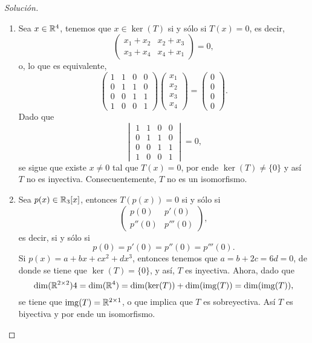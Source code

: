 \documentclass[a4,11pt]{aleph-notas}
\begin{document}
\begin{proof}[Solución]\hspace{0pt}
    \begin{enumerate}
        \item Sea $x\in\mathbb{R}^4$, tenemos que $x\in\ker(T)$ si y sólo si $T(x)=0$, es decir,
        \[
            \begin{pmatrix}
            x_1 + x_2 & x_2 + x_3\\
            x_3 + x_4 & x_4 + x_1
            \end{pmatrix} = 0,
        \]
        o, lo que es equivalente,
        \[
            \begin{pmatrix}
            1 & 1 & 0 & 0\\
            0 & 1 & 1 & 0\\
            0 & 0 & 1 & 1\\
            1 & 0 & 0 & 1 
            \end{pmatrix} \begin{pmatrix}
            x_1 \\ x_2 \\ x_3 \\ x_4
            \end{pmatrix} = \begin{pmatrix}
            0 \\ 0 \\ 0 \\ 0
            \end{pmatrix}.
        \]
        Dado que
        \[
            \begin{vmatrix}
            1 & 1 & 0 & 0\\
            0 & 1 & 1 & 0\\
            0 & 0 & 1 & 1\\
            1 & 0 & 0 & 1 
            \end{vmatrix} = 0,
        \]
        se sigue que existe $x\neq 0$ tal que $T(x) = 0$, por ende $\ker(T)\neq \{0\}$ y así $T$ no es inyectiva. Consecuentemente, $T$ no es un isomorfismo.
        
        \item Sea $p(x)\in\mathbb{R}_3[x]$, entonces $T(p(x))= 0$ si y sólo si
        \[
            \begin{pmatrix}
        p(0) & p'(0) \\
        p''(0) & p'''(0)
        \end{pmatrix},
        \]
        es decir, si y sólo si 
        \[
            p(0) = p'(0) = p''(0) = p'''(0).
        \]
        Si $p(x) = a + bx + cx^2 + dx^3$, entonces tenemos que $a = b + 2c = 6d = 0$, de donde se tiene que $\ker(T)=\{0\}$, y así, $T$ es inyectiva. Ahora, dado que
        \[
           \dim(\mathbb{R}^{2\times 2}) 4 = \dim(\mathbb{R}^4) = \dim(\ker(T)) + \dim(\operatorname{img}(T)) = \dim(\operatorname{img}(T)),
        \]
        se tiene que $\operatorname{img}(T)=\mathbb{R}^{2\times 1}$, o que implica que $T$ es sobreyectiva. Así $T$ es biyectiva y por ende un isomorfismo.
        

\end{enumerate}
\end{proof}
\end{document}

